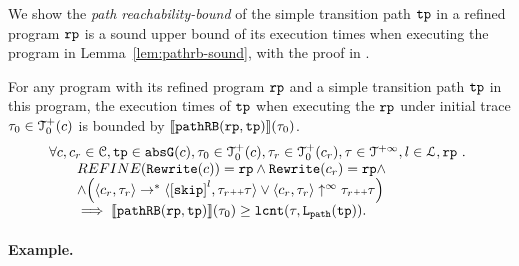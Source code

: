 We show the \emph{path reachability-bound} of the simple transition path $\mathtt{tp}$ in a refined program $\mathtt{rp}$ is a sound upper bound of its execution times when executing the program in Lemma~\ref{lem:pathrb-sound}, with the proof in .
\begin{lem}
  \label{lem:pathrb-sound}
  For any program with its refined program $\mathtt{rp}$ and a simple transition path $\mathtt{tp}$ in this program,
  the execution times of $\mathtt{tp}$ when executing the $\mathtt{rp}$ under initial trace $\mathtt{\tau}_0 \in \mathcal{T}^{+}_0(c)$ is bounded by $\llbracket \mathtt{pathRB}(\mathtt{rp}, \mathtt{tp}) \rrbracket(\mathtt{\tau}_0)$.
  \[
    \begin{array}{l}
    \forall c, c_r \in \cdom, \tpath \in \absG(c), \trace_0 \in \ftdom_0(c),  \trace_r \in \ftdom_0(c_r), \trace \in \tdom, l \in \ldom, \rprog \st 
    \\ \qquad
    REFINE(\algrewrite(c)) = \rprog
    \land 
    \algrewrite(c_r) = \rprog
    \land
    \\ \qquad
    \land 
    \Big(
      \config{c_r, \trace_r} \rightarrow^* \config{\clabel{\eskip}^{l}, \trace_r \tracecat \trace}
      \lor \config{c_r, \trace_r} \uparrow^{\infty} \trace_r \tracecat \trace 
      \Big)
  \\ \qquad
    \implies
    \econfig{\inoutB(\rprog, \tpath)}(\trace_0) \geq \lcounter(\trace, \pathl(\tpath)).
    \end{array}
  \]  
\end{lem}
\paragraph{Example.}


